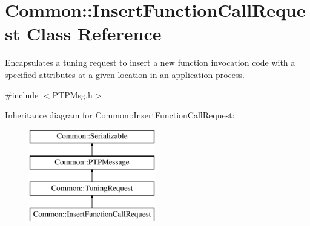 \hypertarget{class_common_1_1_insert_function_call_request}{\section{Common\-:\-:Insert\-Function\-Call\-Request Class Reference}
\label{class_common_1_1_insert_function_call_request}
}


Encapsulates a tuning request to insert a new function invocation code with a specified attributes at a given location in an application process.  




{\ttfamily \#include $<$P\-T\-P\-Msg.\-h$>$}

Inheritance diagram for Common\-:\-:Insert\-Function\-Call\-Request\-:\begin{figure}[H]
\begin{center}
\leavevmode
\includegraphics[height=4.000000cm]{class_common_1_1_insert_function_call_request}
\end{center}
\end{figure}
